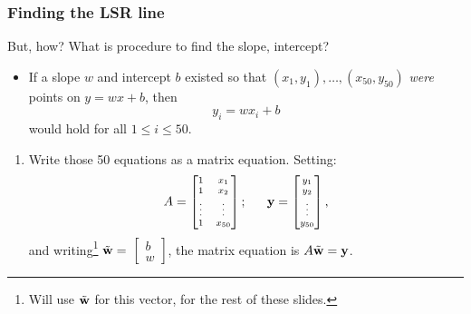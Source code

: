 \documentclass{beamer}
\theoremstyle{example}
\begin{document}
\begin{frame}[fragile]
\frametitle{Finding the LSR line}

But, how?  What is procedure to find the slope, intercept?

\pause
\begin{itemize}
    \item If a slope $w$ and intercept $b$ existed so that $(x_1,y_1),\ldots,(x_{50},y_{50})$ \emph{were} points on $y = wx+b$, then 
    \[y_i = wx_i + b\]
would hold for all $1\le i\le 50$.
\end{itemize}

\pause
\begin{enumerate}
    \item Write those 50 equations as a matrix equation. Setting: 
    \[{\scriptsize A = \begin{bmatrix}1 & x_1 \\ 1 & x_2 \\ \vdots & \vdots \\ 1 & x_{50}\end{bmatrix}; \qquad 
      {\bf y} = \begin{bmatrix}y_1 \\ y_2 \\ \vdots \\ y_{50}\end{bmatrix}, }\]
    and writing\footnote{Will use $\tilde{\bf w}$ for this vector, for the rest of these slides.} $\tilde{\bf w} = $ {\small $\begin{bmatrix}b\\ w\end{bmatrix}$}, the matrix equation is $A\tilde{\textbf{w}} = {\bf y}$.
\end{enumerate}
    
\vfill
\end{frame}
    
\end{document}

